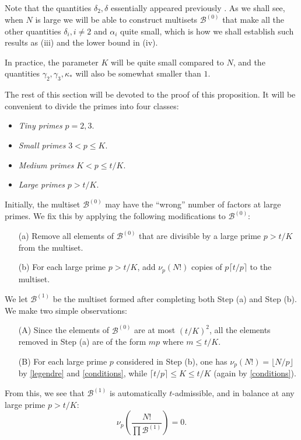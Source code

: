 \documentclass[12pt,a4paper,reqno]{amsart}
\numberwithin{equation}{section}
\theoremstyle{plain}
\theoremstyle{definition}
\newcommand\tuple{{\mathcal B}}
\begin{document}
Note that the quantities $\delta_2, \delta$ essentially appeared previously .  As we shall see, when $N$ is large we will be able to construct multisets $\tuple^{(0)}$ that make all the other quantities $\delta_i, i \neq 2$ and $\alpha_i$ quite small, which is how we shall establish such results as (iii) and the lower bound in (iv).

In practice, the parameter $K$ will be quite small compared to $N$, and the quantities $\gamma_2, \gamma_3, \kappa_{*}$ will also be somewhat smaller than $1$.

The rest of this section will be devoted to the proof of this proposition.  It will be convenient to divide the primes into four classes:
  \begin{itemize}
    \item \emph{Tiny primes} $p=2,3$.
    \item \emph{Small primes} $3 < p \leq K$.
    \item \emph{Medium primes} $K < p \leq t/K$.
    \item \emph{Large primes} $p > t/K$.
    \end{itemize}
Initially, the multiset $\tuple^{(0)}$ may have the ``wrong'' number of factors at large primes.  We fix this by applying the following modifications to $\tuple^{(0)}$:
\begin{itemize}
  \item[(a)] Remove all elements of $\tuple^{(0)}$ that are divisible by a large prime $p > t/K$ from the multiset.
  \item[(b)] For each large prime $p > t/K$, add $\nu_p(N!)$ copies of $p \lceil t/p \rceil$ to the multiset.
\end{itemize}
We let $\tuple^{(1)}$ be the multiset formed after completing both Step (a) and Step (b).  We make two simple observations:
\begin{itemize}
\item[(A)] Since the elements of $\tuple^{(0)}$ are at most $(t/K)^2$, all the elements removed in Step (a) are of the form $mp$ where $m \leq t/K$.
\item[(B)] For each large prime $p$ considered in Step (b),  one has $\nu_p(N!) = \lfloor N/p \rfloor$ by \eqref{legendre} and \eqref{conditions}, while $\lceil t/p \rceil \leq K \leq t/K$ (again by \eqref{conditions}).  
\end{itemize}
From this, we see that $\tuple^{(1)}$ is automatically $t$-admissible, and in balance at any large prime $p > t/K$:
$$ \nu_p\left(\frac{N!}{\prod \tuple^{(1)}}\right) = 0.$$
\end{document}
